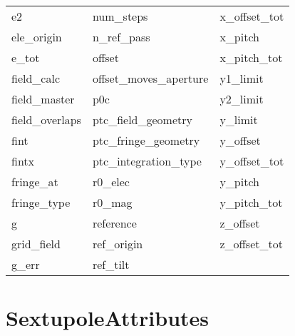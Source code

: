 \begin{tabular}{lll}
e2                          & num_steps                   & x_offset_tot                \\
ele_origin                  & n_ref_pass                  & x_pitch                     \\
e_tot                       & offset                      & x_pitch_tot                 \\
field_calc                  & offset_moves_aperture       & y1_limit                    \\
field_master                & p0c                         & y2_limit                    \\
field_overlaps              & ptc_field_geometry          & y_limit                     \\
fint                        & ptc_fringe_geometry         & y_offset                    \\
fintx                       & ptc_integration_type        & y_offset_tot                \\
fringe_at                   & r0_elec                     & y_pitch                     \\
fringe_type                 & r0_mag                      & y_pitch_tot                 \\
g                           & reference                   & z_offset                    \\
grid_field                  & ref_origin                  & z_offset_tot                \\
g_err                       & ref_tilt                    &                             \\
 \bottomrule
 \end{tabular}
 \vfill
 
 \section{SextupoleAttributes}
 \label{s:list.sextupole}
 
